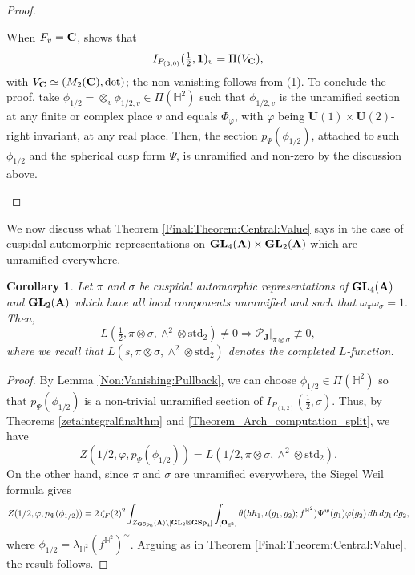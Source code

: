 \documentclass[11pt, reqno]{amsart}
\theoremstyle{plain}
\newtheorem{corollary}[theorem]{Corollary}
\theoremstyle{definition}
\theoremstyle{remark}
\theoremstyle{plain}
\def\C{{\bf C}}
\def\A{{\bf A}}
\def\GSp{{\mathbf{GSp}}}
\def\U{{\mathbf{U}}}
\def\GL{\mathbf{GL}}
\begin{document}
\begin{proof}
\begin{enumerate}
    When $F_v = \C$, \cite[Theorem 1, Case IId]{Soo:Bo} shows that $$I_{P_{(3,0)}}(\tfrac{1}{2},\mathbf{1})_v =\Pi(V_\C),$$ with $V_\C \simeq (M_2(\C), {\rm det})$; the non-vanishing follows from (1). To conclude the proof, take $\phi_{1/2} = \otimes_v \phi_{1/2,v}\in \Pi(\mathbb{H}^2)$ such that $\phi_{1/2,v}$ is the unramified section at any finite or complex place $v$ and equals $\Phi_{\varphi}$, with $\varphi$ being $\U(1)\times \U(2)$-right invariant, at any real place. Then, the section $p_{\Psi}(\phi_{1/2})$, attached to such $\phi_{1/2}$ and the spherical cusp form $\Psi$, is unramified and non-zero by the discussion above.
    \end{enumerate}
\end{proof}

We now discuss what Theorem \ref{Final:Theorem:Central:Value} says in the case of cuspidal automorphic representations on $\GL_4(\A) \times \GL_2(\A)$ which are unramified everywhere. 

\begin{corollary}\label{Main:Corollary:Non:Spherical}
     Let $\pi$ and $\sigma$ be cuspidal automorphic representations of $\GL_4(\A)$ and $\GL_2(\A)$ which have all local components unramified and such that $\omega_\pi \omega_\sigma = 1.$ Then, 
\[L(\tfrac{1}{2}, \pi \otimes \sigma, \wedge^2 \otimes  \mathrm{std}_2) \neq 0 \Longrightarrow {\mathcal{P}_{ \mathbf{J}}}|_{\pi \otimes \sigma} \not \equiv 0,\]
where we recall that $L(s, \pi \otimes \sigma, \wedge^2 \otimes  \mathrm{std}_2)$ denotes the completed $L$-function.
\end{corollary} 
\begin{proof}
By Lemma \ref{Non:Vanishing:Pullback}, we can choose $\phi_{1/2}\in \Pi(\mathbb{H}^2)$ so that $p_\Psi(\phi_{1/2})$ is a non-trivial unramified section of $I_{P_{(1,2)}}(\tfrac{1}{2},\sigma)$. Thus,  by Theorems \ref{zetaintegralfinalthm} and \ref{Theorem_Arch_computation_split}, we have $$ Z(1/2,\varphi, p_\Psi(\phi_{1/2})) =L(1/2, \pi \otimes \sigma, \wedge^2 \otimes  \mathrm{std}_2).$$
On the other hand, since $\pi$ and $\sigma$ are unramified everywhere, the Siegel Weil formula gives 
$$ Z(1/2,\varphi, p_\Psi(\phi_{1/2})) = 2 \,\zeta_F(2)^2  \int_{Z_{\GSp_6}(\A)\backslash [\GL_2\boxtimes \GSp_4]} \int_{[\mathbf{O}_{\mathbb{H}^2}]} \theta(h h_1, \iota( g_1  , g_2) ; f^{\mathbb{H}^2}) \Psi^w( g_1 ) \varphi(g_2) \, d h \, dg_1\,dg_2,$$
where $\phi_{1/2} = \lambda_{\mathbb{H}^2}(f^{\mathbb{H}^2})^\sim$. Arguing as in Theorem \ref{Final:Theorem:Central:Value}, the result follows.
\end{proof}
\end{document}
